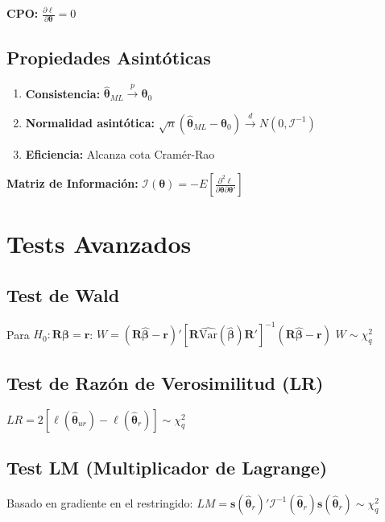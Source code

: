 \documentclass[9pt, spanish, twoside]{article}
\newcommand{\eqbox}[1]{\colorbox{TitaniumGray}{$\displaystyle #1$}}
\begin{document}
\begin{multicols*}{3}
\textbf{CPO:} $\frac{\partial \ell}{\partial \boldsymbol{\theta}} = 0$

\subsection{Propiedades Asintóticas}
\begin{enumerate}[leftmargin=8pt, noitemsep, topsep=2pt]
    \item \textbf{Consistencia:} $\hat{\boldsymbol{\theta}}_{ML} \xrightarrow{p} \boldsymbol{\theta}_0$
    \item \textbf{Normalidad asintótica:}
    $\sqrt{n}(\hat{\boldsymbol{\theta}}_{ML} - \boldsymbol{\theta}_0) \xrightarrow{d} N(0, \mathcal{I}^{-1})$
    \item \textbf{Eficiencia:} Alcanza cota Cramér-Rao
\end{enumerate}

\textbf{Matriz de Información:}
$\mathcal{I}(\boldsymbol{\theta}) = -E\left[\frac{\partial^2 \ell}{\partial \boldsymbol{\theta}\partial\boldsymbol{\theta}'}\right]$

\section{Tests Avanzados}
\subsection{Test de Wald}
Para $H_0: \mathbf{R}\boldsymbol{\beta} = \mathbf{r}$:
\eqbox{W = (\mathbf{R}\hat{\boldsymbol{\beta}} - \mathbf{r})'\left[\mathbf{R}\widehat{\text{Var}}(\hat{\boldsymbol{\beta}})\mathbf{R}'\right]^{-1}(\mathbf{R}\hat{\boldsymbol{\beta}} - \mathbf{r})}
$W \sim \chi^2_q$

\subsection{Test de Razón de Verosimilitud (LR)}
\eqbox{LR = 2[\ell(\hat{\boldsymbol{\theta}}_{ur}) - \ell(\hat{\boldsymbol{\theta}}_r)] \sim \chi^2_q}

\subsection{Test LM (Multiplicador de Lagrange)}
Basado en gradiente en el restringido:
$LM = \mathbf{s}(\hat{\boldsymbol{\theta}}_r)'\mathcal{I}^{-1}(\hat{\boldsymbol{\theta}}_r)\mathbf{s}(\hat{\boldsymbol{\theta}}_r) \sim \chi^2_q$


\end{multicols*}
\end{document}
